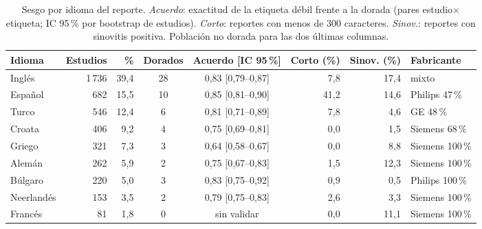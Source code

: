 \begin{table}[t]
  \caption{Sesgo por idioma del reporte. \emph{Acuerdo}: exactitud de la etiqueta débil
    frente a la dorada (pares estudio$\times$etiqueta; IC 95\,\% por bootstrap de
    estudios). \emph{Corto}: reportes con menos de 300 caracteres. \emph{Sinov.}: reportes
    con sinovitis positiva. Población no dorada para las dos últimas columnas.}
  \label{tab:idiomas}
  \centering
  \small
  \setlength{\tabcolsep}{4pt}
  \begin{tabular}{lrrccrrl}
    \toprule
    Idioma & Estudios & \% & Dorados & Acuerdo [IC 95\,\%] & Corto (\%) & Sinov. (\%) & Fabricante \\
    \midrule
    Inglés     & 1\,736 & 39,4 & 28 & 0,83 [0,79--0,87] &  7,8 & 17,4 & mixto \\
    Español    &    682 & 15,5 & 10 & 0,85 [0,81--0,90] & 41,2 & 14,6 & Philips 47\,\% \\
    Turco      &    546 & 12,4 &  6 & 0,81 [0,71--0,89] &  7,8 &  4,6 & GE 48\,\% \\
    Croata     &    406 &  9,2 &  4 & 0,75 [0,69--0,81] &  0,0 &  1,5 & Siemens 68\,\% \\
    Griego     &    321 &  7,3 &  3 & 0,64 [0,58--0,67] &  0,0 &  8,8 & Siemens 100\,\% \\
    Alemán     &    262 &  5,9 &  2 & 0,75 [0,67--0,83] &  1,5 & 12,3 & Siemens 100\,\% \\
    Búlgaro    &    220 &  5,0 &  3 & 0,83 [0,75--0,92] &  0,9 &  0,5 & Philips 100\,\% \\
    Neerlandés &    153 &  3,5 &  2 & 0,79 [0,75--0,83] &  2,6 &  3,3 & Siemens 100\,\% \\
    Francés    &     81 &  1,8 &  0 & sin validar       &  0,0 & 11,1 & Siemens 100\,\% \\
    \bottomrule
  \end{tabular}
\end{table}
